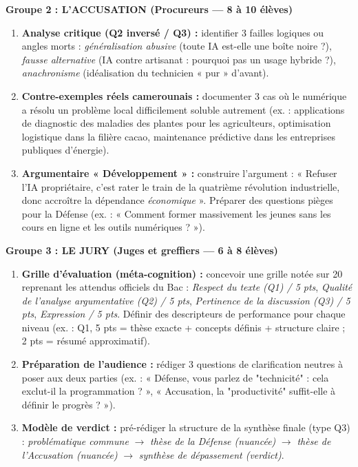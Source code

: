 \documentclass[11pt]{article}
\newcommand{\cle}[1]{{\popxbold\color{popdark}#1}}
\begin{document}
\textbf{Groupe 2 : L'ACCUSATION (Procureurs --- 8 à 10 élèves)}
\begin{enumerate}
    \item \textbf{Analyse critique (Q2 inversé / Q3) :} identifier 3 \cle{failles logiques} ou \cle{angles morts} : \emph{généralisation abusive} (toute IA est-elle une boîte noire ?), \emph{fausse alternative} (IA contre artisanat : pourquoi pas un usage hybride ?), \emph{anachronisme} (idéalisation du technicien « pur » d'avant).
    \item \textbf{Contre-exemples réels camerounais :} documenter 3 cas où le numérique a \cle{résolu} un problème local difficilement soluble autrement (ex. : applications de diagnostic des maladies des plantes pour les agriculteurs, optimisation logistique dans la filière cacao, maintenance prédictive dans les entreprises publiques d'énergie).
    \item \textbf{Argumentaire « Développement » :} construire l'argument : « Refuser l'IA propriétaire, c'est rater le train de la quatrième révolution industrielle, donc accroître la dépendance \emph{économique} ». Préparer des \cle{questions pièges} pour la Défense (ex. : « Comment former massivement les jeunes sans les cours en ligne et les outils numériques ? »).
\end{enumerate}

\textbf{Groupe 3 : LE JURY (Juges et greffiers --- 6 à 8 élèves)}
\begin{enumerate}
    \item \textbf{Grille d'évaluation (méta-cognition) :} concevoir une grille notée sur 20 reprenant les attendus officiels du Bac : \emph{Respect du texte (Q1) / 5 pts}, \emph{Qualité de l'analyse argumentative (Q2) / 5 pts}, \emph{Pertinence de la discussion (Q3) / 5 pts}, \emph{Expression / 5 pts}. Définir des \cle{descripteurs de performance} pour chaque niveau (ex. : Q1, 5 pts = thèse exacte + concepts définis + structure claire ; 2 pts = résumé approximatif).
    \item \textbf{Préparation de l'audience :} rédiger 3 \cle{questions de clarification} neutres à poser aux deux parties (ex. : « Défense, vous parlez de "technicité" : cela exclut-il la programmation ? », « Accusation, la "productivité" suffit-elle à définir le progrès ? »).
    \item \textbf{Modèle de verdict :} pré-rédiger la structure de la synthèse finale (type Q3) : \emph{problématique commune} $\rightarrow$ \emph{thèse de la Défense (nuancée)} $\rightarrow$ \emph{thèse de l'Accusation (nuancée)} $\rightarrow$ \emph{synthèse de dépassement (verdict)}.
\end{enumerate}
\end{document}
